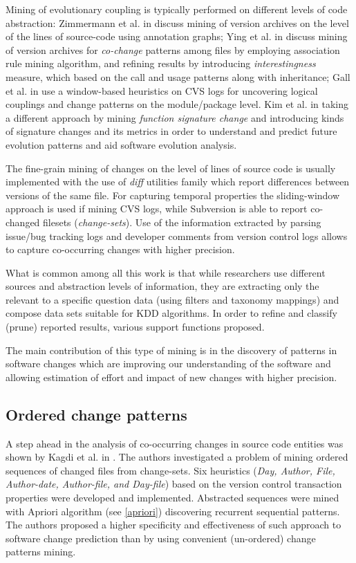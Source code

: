 Mining of evolutionary coupling is typically performed on different levels of code abstraction: Zimmermann et al. in \cite{citeulike:4406375} discuss mining of version archives on the level of the lines of source-code using annotation graphs; Ying et al. in \cite{citeulike:983796} discuss mining of version archives for \textit{co-change} patterns among files by employing association rule mining algorithm, and refining results by introducing \textit{interestingness} measure, which based on the call and usage patterns along with inheritance; Gall et al. in \cite{citeulike:5397994} use a window-based heuristics on CVS logs for uncovering logical couplings and change patterns on the module/package level. Kim et al. in \cite{citeulike:5375867} taking a different approach by mining \textit{function signature change} and introducing kinds of signature changes and its metrics in order to understand and predict future evolution patterns and aid software evolution analysis.

The fine-grain mining of changes on the level of lines of source code is usually implemented with the use of \textit{diff} utilities family which report differences between versions of the same file. For capturing temporal properties the sliding-window approach is used if mining CVS logs, while Subversion is able to report co-changed filesets (\textit{change-sets}). Use of the information extracted by parsing issue/bug tracking logs and developer comments from version control logs allows to capture co-occurring changes with higher precision.

What is common among all this work is that while researchers use different sources and abstraction levels of information, they are extracting only the relevant to a specific question data (using filters and taxonomy mappings) and compose data sets suitable for KDD algorithms. In order to refine and classify (prune) reported results, various support functions proposed.

The main contribution of this type of mining is in the discovery of patterns in software changes which are improving our  understanding of the software and allowing estimation of effort and impact of new changes with higher precision.

\subsection{Ordered change patterns}
A step ahead in the analysis of co-occurring changes in source code entities was shown by Kagdi et al. in \cite{citeulike:3929070}. The authors investigated a problem of mining ordered sequences of changed files from change-sets. Six heuristics (\textit{Day, Author, File, Author-date, Author-file, and Day-file}) based on the version control transaction properties were developed and implemented. Abstracted sequences were mined with Apriori algorithm (see \ref{apriori}) discovering recurrent sequential patterns. The authors proposed a higher specificity and effectiveness of such approach to software change prediction than by using convenient (un-ordered) change patterns mining.

